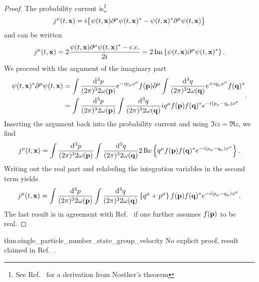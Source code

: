 \begin{proof}
	The probability current is\footnote{See Ref.~\cite[p.~18]{Peskin1995} for a derivation from Noether's theorem}
	\begin{equation*}
		j^\mu(t,\vb{x})
		=
		i
		\bigl\{
			\psi(t,\vb{x})
			\partial^\mu
			\psi(t,\vb{x})^*
			-
			\psi(t,\vb{x})^*
			\partial^\mu
			\psi(t,\vb{x})
		\bigr\}
	\end{equation*}
	and can be written
	\begin{equation*}
		j^\mu(t,\vb{x})
		=
		2\frac{\psi(t,\vb{x})\partial^\mu\psi(t,\vb{x})^*-\text{c.c.}}{2i}
		=
		2\operatorname{\operatorname{Im}}\left\{
			\psi(t,\vb{x})
			\partial^\mu
			\psi(t,\vb{x})^*
		\right\}
		.
	\end{equation*}
	We proceed with the argument of the imaginary part
	\begin{equation*}
		\begin{split}
			\psi(t,\vb{x})^*
			\partial^\mu
			\psi(t,\vb{x})
			&=
			\int\frac{\dd[3]{p}}{(2\pi)^32\omega(\vb{p})}
			e^{-ip_\mu x^\mu}
			f(\vb{p})
			\partial^\mu
			\int\frac{\dd[3]{q}}{(2\pi)^32\omega(\vb{q})}
			e^{+iq_\mu x^\mu}
			f(\vb{q})^*
			\\
			&=
			\int\frac{\dd[3]{p}}{(2\pi)^32\omega(\vb{p})}
			\int\frac{\dd[3]{q}}{(2\pi)^32\omega(\vb{q})}
			iq^\mu
			f(\vb{p})
			f(\vb{q})^*
			e^{-i(p_\mu-q_\mu)x^\mu}
		\end{split}
		.
	\end{equation*}
	Inserting the argument back into the probability current and using $\Im{iz}=\Re{z}$, we find
	\begin{equation*}
		j^\mu(t,\vb{x})
		=
		\int\frac{\dd[3]{p}}{(2\pi)^32\omega(\vb{p})}
		\int\frac{\dd[3]{q}}{(2\pi)^32\omega(\vb{q})}
		2\operatorname{\operatorname{Re}}\left\{
			q^\mu
			f(\vb{p})
			f(\vb{q})^*
			e^{-i(p_\mu-q_\mu)x^\mu}
		\right\}
		.
	\end{equation*}
	Writing out the real part and relabeling the integration variables in the second term yields
	\begin{equation*}
		j^\mu(t,\vb{x})
		=
		\int\frac{\dd[3]{p}}{(2\pi)^32\omega(\vb{p})}
		\int\frac{\dd[3]{q}}{(2\pi)^32\omega(\vb{q})}
		\left\{
			q^\mu
			+
			p^\mu
		\right\}
		f(\vb{p})
		f(\vb{q})^*
		e^{-i(p_\mu-q_\mu)x^\mu}
		.
	\end{equation*}	
	The last result is in agreement with Ref.~\cite[eqs.~36,37]{Naumov2013} if one further assumes $f(\vb{p})$ to be real.
\end{proof}
\begin{delayedproof}{thm:single_particle_number_state_group_velocity}
	No explicit proof, result claimed in Ref.~\cite[eq.~38]{Naumov2013}.
\end{delayedproof}


